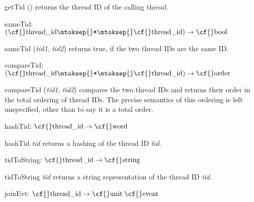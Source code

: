 \begin{descr}
\begin{speccomment}
\item {\cf \small get\-Tid ()           } 
returns the thread ID of the calling thread.     \end{speccomment}
\item {}{} {\cf sameTid: \((\mbox{\cf{}thread\_id}\mtoksep{}\verb,*,\mtoksep{}\mbox{\cf{}thread\_id})\rightarrow \mbox{\cf{}bool}\)}\label{val-CML.sameTid}


\begin{speccomment}
\item {\cf \small same\-Tid (\mbox{\cf \small \textit{tid1}}, \mbox{\cf \small \textit{tid2}})           } 
returns true, if the two thread IDs are the same ID.     \end{speccomment}
\item {}{} {\cf compareTid: \((\mbox{\cf{}thread\_id}\mtoksep{}\verb,*,\mtoksep{}\mbox{\cf{}thread\_id})\rightarrow \mbox{\cf{}order}\)}\label{val-CML.compareTid}


\begin{speccomment}
\item {\cf \small compare\-Tid (\mbox{\cf \small \textit{tid1}}, \mbox{\cf \small \textit{tid2}})           } 
compares the two thread IDs and returns their order in the total 	  ordering of thread IDs. 	  The precise semantics of this ordering is left unspecified, other 	  than to say it is a total order.     \end{speccomment}
\item {}{} {\cf hashTid: \(\mbox{\cf{}thread\_id}\rightarrow \mbox{\cf{}word}\)}\label{val-CML.hashTid}


\begin{speccomment}
\item {\cf \small hash\-Tid \mbox{\cf \small \textit{tid}}           } 
returns a hashing of the thread ID \mbox{\cf \small \textit{tid}}.     \end{speccomment}
\item {}{} {\cf tidToString: \(\mbox{\cf{}thread\_id}\rightarrow \mbox{\cf{}string}\)}\label{val-CML.tidToString}


\begin{speccomment}
\item {\cf \small tid\-To\-String \mbox{\cf \small \textit{tid}}           } 
returns a string representation of the thread ID \mbox{\cf \small \textit{tid}}.     \end{speccomment}
\item {}{} {\cf joinEvt: \(\mbox{\cf{}thread\_id}\rightarrow \mbox{\cf{}unit}\;\mbox{\cf{}event}\)}\label{val-CML.joinEvt}



\end{descr}
